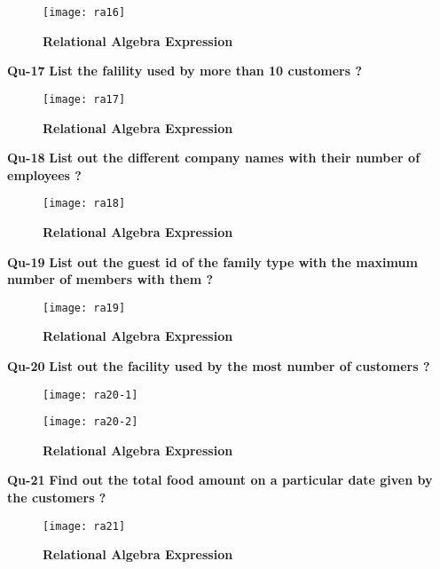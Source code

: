 \documentclass[a4,12pt]{report}
\begin{document}
\begin{figure}[hbtp]
\centering
\texttt{[image: ra16]}
\caption{\textbf{{\color{red}Relational Algebra Expression}}}
\end{figure}

\textbf{Qu-17} \textbf{ List the falility used by more than 10 customers ? }\\

\begin{figure}[hbtp]
\centering
\texttt{[image: ra17]}
\caption{\textbf{{\color{red}Relational Algebra Expression}}}
\end{figure}

\newpage
\textbf{Qu-18} \textbf{ List out the different company names with their number of employees ? }\\

\begin{figure}[hbtp]
\centering
\texttt{[image: ra18]}
\caption{\textbf{{\color{red}Relational Algebra Expression}}}
\end{figure}

\textbf{Qu-19} \textbf{ List out the guest id of the family type with the maximum number of members with them ? }\\

\begin{figure}[hbtp]
\centering
\texttt{[image: ra19]}
\caption{\textbf{{\color{red}Relational Algebra Expression}}}
\end{figure}

\newpage
\textbf{Qu-20} \textbf{ List out the facility used by the most number of customers ? }\\

\begin{figure}[hbtp]
\centering
\texttt{[image: ra20-1]}
\caption{\textbf{{\color{red}}}}
\end{figure}
\begin{figure}[hbtp]
\centering
\texttt{[image: ra20-2]}
\caption{\textbf{{\color{red}Relational Algebra Expression}}}
\end{figure}

\textbf{Qu-21} \textbf{ Find out the total food amount on a particular date given by the customers ? }\\

\begin{figure}[hbtp]
\centering
\texttt{[image: ra21]}
\caption{\textbf{{\color{red}Relational Algebra Expression}}}
\end{figure}
\end{document}
